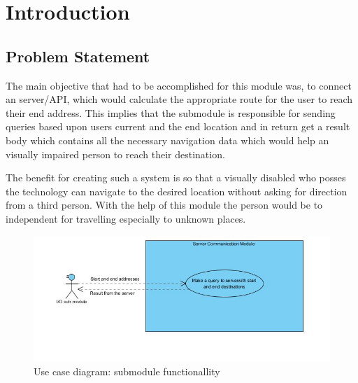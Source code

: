 \newpage
\chapter{Introduction}
	\section{Problem Statement}
		\label{sec:introProblemStatement}
		The main objective that had to be accomplished for this module was, to connect an 
		server/API, which would calculate the appropriate route for the user to reach their end address. 
		This implies that the submodule is responsible for sending queries based upon users 
		current and the end location and in return get a result body which contains
		all the necessary navigation data which would help an visually impaired person to reach their 
		destination.
		
		\par
			The benefit for creating such a system is so that a visually disabled who posses
			the technology can navigate to the desired location without asking for direction
			from a third person. With the help of this module the person would be
			to independent for travelling especially to unknown places. 
	
		\begin{figure}[htbp!]
			\centering \includegraphics[scale=0.8]{grafiken/googleServerCommunication.jpg}
			\caption{Use case diagram: submodule functionallity}
			\label{fig:Google API communication}
		\end{figure}

